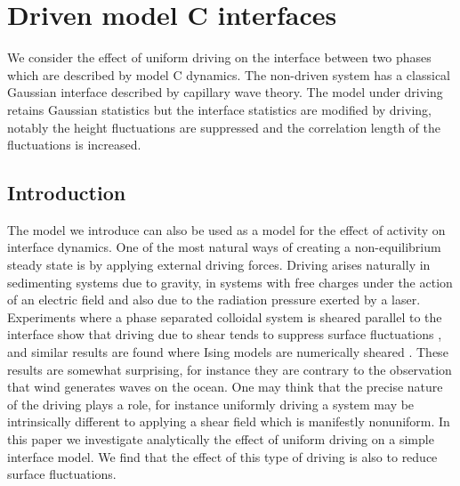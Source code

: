 
\chapter{Driven model C interfaces}
We consider the effect of uniform driving on the interface between two phases which are described by model C dynamics. The non-driven system has a classical Gaussian interface described by capillary wave theory. The model under driving retains Gaussian statistics but the interface statistics are modified by driving, notably the height fluctuations are suppressed and  the correlation length of the fluctuations is increased.

\section{Introduction}
The model we introduce can also be used as a model for the effect of activity on interface dynamics.
One of the most natural ways of creating a non-equilibrium steady state is by applying external  driving forces. Driving arises naturally in sedimenting systems due to gravity, in systems with free charges under the action of an electric field and also  due to the radiation pressure exerted by a laser. Experiments where a phase separated colloidal system is sheared parallel to the interface show that  driving due to shear tends to suppress surface fluctuations \cite{derks2006},
and similar results are found where Ising models are numerically sheared 
\cite{smith2008,smith2010}. These results are somewhat surprising, for instance they are contrary to the  observation that wind generates waves on the ocean. One may think that the precise nature of the driving plays a role, for instance uniformly driving a system may be intrinsically different to applying a shear field which is manifestly nonuniform. In this paper we investigate analytically the effect of uniform driving on a simple interface model. We find that the effect of this type of  driving is also to reduce surface fluctuations.

